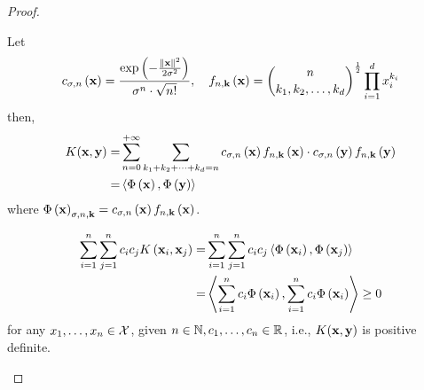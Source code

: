 \begin{proof}
\begin{enumerate}
		      Let
		      \begin{equation*}
			      c_{\sigma,n}\left(\mathbf{x}\right)=\frac{\exp\left(-\frac{\|\mathbf{x}\|^{2}}{2\sigma^{2}}\right)}{\sigma^{n}\cdot\sqrt{n!}},\quad f_{n,\mathbf{k}}\left(\mathbf{x}\right)=\binom{n}{k_{1},k_{2},\ldots,k_{d}}^{\frac{1}{2}}\prod_{i=1}^{d}x_{i}^{k_{i}}
		      \end{equation*}
		      then,
		      \begin{equation*}
			      \begin{aligned}
				      K(\mathbf{x},\mathbf{y})= & \sum_{n=0}^{+\infty}\sum_{k_{1}+k_{2}+\cdots+k_{d}=n}c_{\sigma,n}\left(\mathbf{x}\right)f_{n,\mathbf{k}}\left(\mathbf{x}\right)\cdot c_{\sigma,n}\left(\mathbf{y}\right)f_{n,\mathbf{k}}\left(\mathbf{y}\right) \\
				      =                   & \left\langle\Phi\left(\mathbf{x}\right),\Phi\left(\mathbf{y}\right)\right\rangle                                                                                                                          \\
			      \end{aligned}
		      \end{equation*}
		      where \(\Phi\left(\mathbf{x}\right)_{\sigma,n,\mathbf{k}}=c_{\sigma,n}\left(\mathbf{x}\right)f_{n,\mathbf{k}}\left(\mathbf{x}\right)\).

		      \begin{equation*}
			      \begin{aligned}
				      \sum_{i=1}^{n}\sum_{j=1}^{n}c_{i}c_{j}K\left(\mathbf{x}_{i},\mathbf{x}_{j}\right)= & \sum_{i=1}^{n}\sum_{j=1}^{n}c_{i}c_{j}\left\langle\Phi\left(\mathbf{x}_{i}\right),\Phi\left(\mathbf{x}_{j}\right)\right\rangle       \\
				      =                                                                      & \left\langle\sum_{i=1}^{n}c_{i}\Phi\left(\mathbf{x}_{i}\right),\sum_{i=1}^{n}c_{i}\Phi\left(\mathbf{x}_{i}\right)\right\rangle\geq 0
			      \end{aligned}
		      \end{equation*}
		      for any \(x_{1},\ldots,x_{n}\in\mathcal{X}\), given \(n\in\mathbb{N},c_{1},\ldots,c_{n}\in\mathbb{R}\), i.e., \(K(\mathbf{x},\mathbf{y})\) is positive definite.
	\end{enumerate}
\end{proof}
